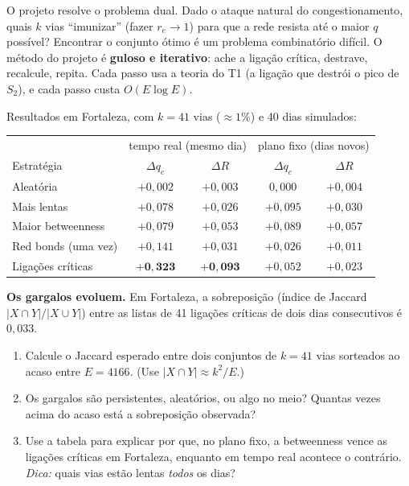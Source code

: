 \documentclass[11pt]{article}
\begin{document}
\begin{ideia}
O projeto resolve o problema dual. Dado o ataque natural do congestionamento, quais $k$ vias ``imunizar'' (fazer $r_e\to1$) para que a rede resista até o maior $q$ possível? Encontrar o conjunto ótimo é um problema combinatório difícil. O método do projeto é \textbf{guloso e iterativo}: ache a ligação crítica, destrave, recalcule, repita. Cada passo usa a teoria do T1 (a ligação que destrói o pico de $S_2$), e cada passo custa $O(E\log E)$.
\end{ideia}

Resultados em Fortaleza, com $k=41$ vias ($\approx1\%$) e 40 dias simulados:
\begin{center}
\begin{tabular}{lcccc}
\toprule
& \multicolumn{2}{c}{tempo real (mesmo dia)} & \multicolumn{2}{c}{plano fixo (dias novos)}\\
Estratégia & $\Delta q_c$ & $\Delta R$ & $\Delta q_c$ & $\Delta R$\\
\midrule
Aleatória & $+0{,}002$ & $+0{,}003$ & $0{,}000$ & $+0{,}004$\\
Mais lentas & $+0{,}078$ & $+0{,}026$ & $+0{,}095$ & $+0{,}030$\\
Maior betweenness & $+0{,}079$ & $+0{,}053$ & $+0{,}089$ & $+0{,}057$\\
Red bonds (uma vez) & $+0{,}141$ & $+0{,}031$ & $+0{,}026$ & $+0{,}011$\\
Ligações críticas & $\bm{+0{,}323}$ & $\bm{+0{,}093}$ & $+0{,}052$ & $+0{,}023$\\
\bottomrule
\end{tabular}
\end{center}

 \textbf{Os gargalos evoluem.} Em Fortaleza, a sobreposição (índice de Jaccard $|X\cap Y|/|X\cup Y|$) entre as listas de 41 ligações críticas de dois dias consecutivos é $0{,}033$.
\begin{enumerate}
  \item Calcule o Jaccard esperado entre dois conjuntos de $k=41$ vias sorteados ao acaso entre $E=4166$. (Use $|X\cap Y|\approx k^2/E$.)
  \item Os gargalos são persistentes, aleatórios, ou algo no meio? Quantas vezes acima do acaso está a sobreposição observada?
  \item Use a tabela para explicar por que, no plano fixo, a betweenness vence as ligações críticas em Fortaleza, enquanto em tempo real acontece o contrário. \emph{Dica:} quais vias estão lentas \emph{todos} os dias?
\end{enumerate}
\end{document}
